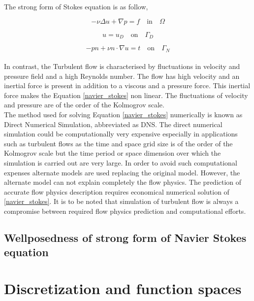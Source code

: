 \documentclass[a4paper,12pt]{book}
\begin{document}
The strong form of Stokes equation is as follow,

\begin{equation} \label{stokes_strong_form}
-\nu \Delta u + \nabla p = f \quad \textrm{in} \quad \Omega
\end{equation}

\begin{equation} \label{dirichlet condition stokes}
u = u_D \quad \textrm{on} \quad \Gamma_D
\end{equation}

\begin{equation} \label{neumann condition stokes}
-pn + \nu n \cdot \nabla u = t \quad \textrm{on} \quad \Gamma_N
\end{equation}
\\

In contrast, the Turbulent flow is characterised by fluctuations in velocity and pressure field and a high Reynolds number. The flow has high velocity and an inertial force is present in addition to a viscous and a pressure force. This inertial force makes the Equation \eqref{navier_stokes} non linear. The fluctuations of velocity and pressure are of the order of the Kolmogrov scale.\\

The method used for solving Equation \eqref{navier_stokes} numerically is known as Direct Numerical Simulation, abbreviated as DNS. The direct numerical simulation could be computationally very expensive especially in applications such as turbulent flows as the time and space grid size is of the order of the Kolmogrov scale but the time period or space dimension over which the simulation is carried out are very large. In order to avoid such computational expenses alternate models are used replacing the original model. However, the alternate model can not explain completely the flow physics. The prediction of accurate flow physics description requires economical numerical solution of \eqref{navier_stokes}. It is to be noted that simulation of turbulent flow is always a compromise between required flow physics prediction and computational efforts.

\section{Wellposedness of strong form of Navier Stokes equation}

\chapter{Discretization and function spaces}
\end{document}
